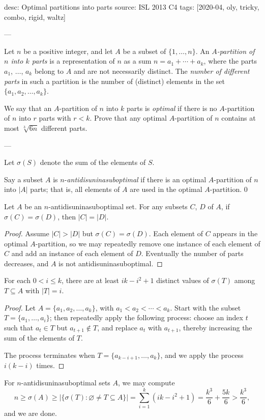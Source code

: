 desc: Optimal partitions into parts
source: ISL 2013 C4
tags: [2020-04, oly, tricky, combo, rigid, waltz]

---

Let $n$ be a positive integer, and let $A$ be a subset of $\{1,\ldots,n\}$. An \emph{$A$-partition of $n$ into $k$ parts} is a representation of $n$ as a sum $n=a_1+\cdots+a_k$, where the parts $a_1$, $\ldots$, $a_k$ belong to $A$ and are not necessarily distinct. The \emph{number of different parts} in such a partition is the number of (distinct) elements in the set $\{a_1,a_2,\ldots,a_k\}$.

We say that an $A$-partition of $n$ into $k$ parts is \emph{optimal} if there is no $A$-partition of $n$ into $r$ parts with $r<k$. Prove that any optimal $A$-partition of $n$ contains at most $\sqrt[3]{6n}$ different parts.

---

Let $\sigma(S)$ denote the sum of the elements of $S$.

Say a subset $A$ is $n$-\emph{antidisuninasuboptimal} if there is an optimal $A$-partition of $n$ into $|A|$ parts; that is, all elements of $A$ are used in the optimal $A$-partition.
\setcounter{claim}0
\begin{claim}
    Let $A$ be an $n$-antidisuninasuboptimal set. For any subsets $C$, $D$ of $A$, if $\sigma(C)=\sigma(D)$, then $|C|=|D|$.
\end{claim}
\begin{proof}
    Assume $|C|>|D|$ but $\sigma(C)=\sigma(D)$. Each element of $C$ appears in the optimal $A$-partition, so we may repeatedly remove one instance of each element of $C$ and add an instance of each element of $D$. Eventually the number of parts decreases, and $A$ is not antidisuninasuboptimal.
\end{proof}
\begin{claim}
    For each $0<i\le k$, there are at least $ik-i^2+1$ distinct values of $\sigma(T)$ among $T\subseteq A$ with $|T|=i$.
\end{claim}
\begin{proof}
    Let $A=\{a_1,a_2,\ldots,a_k\}$, with $a_1<a_2<\cdots<a_k$. Start with the subset $T=\{a_1,\ldots,a_i\}$; then repeatedly apply the following process: choose an index $t$ such that $a_t\in T$ but $a_{t+1}\notin T$, and replace $a_t$ with $a_{t+1}$, thereby increasing the sum of the elements of $T$.

    The process terminates when $T=\{a_{k-i+1},\ldots,a_k\}$, and we apply the process $i(k-i)$ times.
\end{proof}

For $n$-antidisuninasuboptimal sets $A$, we may compute \[n\ge\sigma(A)\ge\left\lvert\{\sigma(T):\varnothing\ne T\subseteq A\}\right\rvert=\sum_{i=1}^k\left(ik-i^2+1\right)=\frac{k^3}6+\frac{5k}6>\frac{k^3}6,\]
and we are done.
